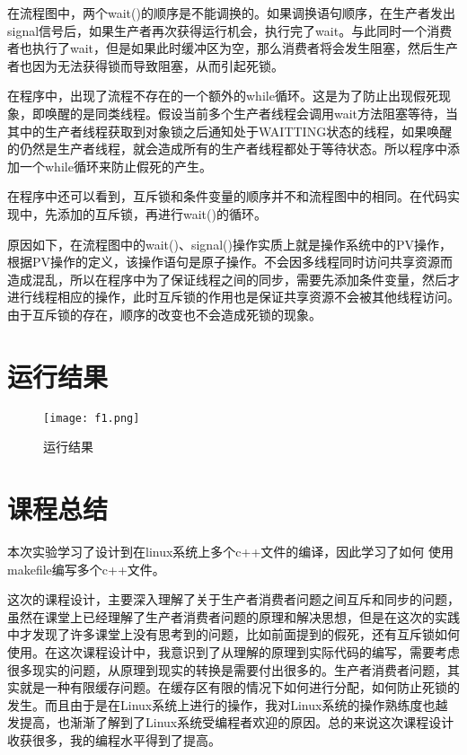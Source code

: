 \documentclass[withoutpreface,bwprint]{cumcmthesis} %
\begin{document}
在流程图中，两个wait()的顺序是不能调换的。如果调换语句顺序，在生产者发出signal信号后，如果生产者再次获得运行机会，执行完了wait。与此同时一个消费者也执行了wait，但是如果此时缓冲区为空，那么消费者将会发生阻塞，然后生产者也因为无法获得锁而导致阻塞，从而引起死锁。

在程序中，出现了流程不存在的一个额外的while循环。这是为了防止出现假死现象，即唤醒的是同类线程。假设当前多个生产者线程会调用wait方法阻塞等待，当其中的生产者线程获取到对象锁之后通知处于WAITTING状态的线程，如果唤醒的仍然是生产者线程，就会造成所有的生产者线程都处于等待状态。所以程序中添加一个while循环来防止假死的产生。

在程序中还可以看到，互斥锁和条件变量的顺序并不和流程图中的相同。在代码实现中，先添加的互斥锁，再进行wait()的循环。

原因如下，在流程图中的wait()、signal()操作实质上就是操作系统中的PV操作，根据PV操作的定义，该操作语句是原子操作。不会因多线程同时访问共享资源而造成混乱，所以在程序中为了保证线程之间的同步，需要先添加条件变量，然后才进行线程相应的操作，此时互斥锁的作用也是保证共享资源不会被其他线程访问。由于互斥锁的存在，顺序的改变也不会造成死锁的现象。

\section{运行结果}

\begin{figure}[H]
	\centering
	\texttt{[image: f1.png]}
	\caption{ 运行结果 \label{fig:1}}
\end{figure}

\section{课程总结}
本次实验学习了设计到在linux系统上多个c++文件的编译，因此学习了如何
使用makefile编写多个c++文件。

这次的课程设计，主要深入理解了关于生产者消费者问题之间互斥和同步的问题，虽然在课堂上已经理解了生产者消费者问题的原理和解决思想，但是在这次的实践中才发现了许多课堂上没有思考到的问题，比如前面提到的假死，还有互斥锁如何使用。在这次课程设计中，我意识到了从理解的原理到实际代码的编写，需要考虑很多现实的问题，从原理到现实的转换是需要付出很多的。生产者消费者问题，其实就是一种有限缓存问题。在缓存区有限的情况下如何进行分配，如何防止死锁的发生。而且由于是在Linux系统上进行的操作，我对Linux系统的操作熟练度也越发提高，也渐渐了解到了Linux系统受编程者欢迎的原因。总的来说这次课程设计收获很多，我的编程水平得到了提高。
\end{document}
